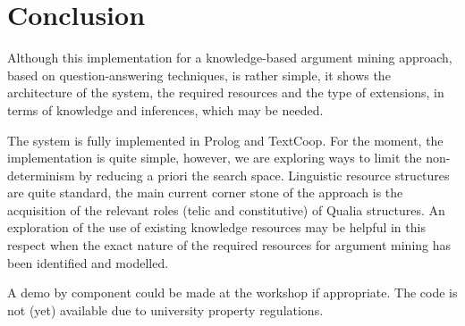 \documentclass[11pt,letterpaper]{article}
\begin{document}
\section{Conclusion}

Although this  implementation for a knowledge-based argument mining approach, based on question-answering techniques, is rather simple, it shows the architecture of the system, the
required resources and the type of extensions, in terms of knowledge and  inferences, which may be needed. 

The system is fully implemented in Prolog and TextCoop. 
For the moment, the implementation is quite simple, however, we are exploring ways to limit the  non-determinism by reducing a priori the search space.
Linguistic resource structures are quite standard, the main current corner stone of the approach is the acquisition of the relevant roles (telic and constitutive) of Qualia structures. 
An exploration of the use of existing knowledge resources may be helpful in this respect when the exact nature of the required resources for argument mining has been identified and modelled.

A demo by component could be made at the workshop if appropriate.  The code is not (yet) available due to university property regulations.



% 

\end{document}
